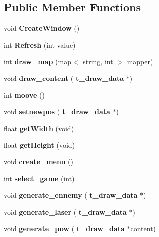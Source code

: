 \subsection*{Public Member Functions}
\begin{DoxyCompactItemize}
\item 
\mbox{\label{classlib___n_c_u_r_s_e_s_a4e2b18378fc2f8e137450e1ce204ab03}} 
void {\bfseries Create\+Window} ()
\item 
\mbox{\label{classlib___n_c_u_r_s_e_s_a74e4f4b1e3b127fa9a0acc40ab01796e}} 
int {\bfseries Refresh} (int value)
\item 
\mbox{\label{classlib___n_c_u_r_s_e_s_a3ebfea69ca0b0cc90be5bef4f3bb0827}} 
int {\bfseries draw\+\_\+map} (map$<$ string, int $>$ mapper)
\item 
\mbox{\label{classlib___n_c_u_r_s_e_s_aa1be8bdce0b43949cddfa0596c3e8651}} 
void {\bfseries draw\+\_\+content} (\textbf{ t\+\_\+draw\+\_\+data} $\ast$)
\item 
\mbox{\label{classlib___n_c_u_r_s_e_s_ae4b417576565df165b47f08f87313e56}} 
int {\bfseries moove} ()
\item 
\mbox{\label{classlib___n_c_u_r_s_e_s_a3443375019352383bb3162a26c990bc3}} 
void {\bfseries setnewpos} (\textbf{ t\+\_\+draw\+\_\+data} $\ast$)
\item 
\mbox{\label{classlib___n_c_u_r_s_e_s_a340d17967c5d4a9a53e60f9903d19537}} 
float {\bfseries get\+Width} (void)
\item 
\mbox{\label{classlib___n_c_u_r_s_e_s_a35d9e822c9d082583a1919afcc047ca1}} 
float {\bfseries get\+Height} (void)
\item 
\mbox{\label{classlib___n_c_u_r_s_e_s_a7e352deb80bbf27cd05355f407416361}} 
void {\bfseries create\+\_\+menu} ()
\item 
\mbox{\label{classlib___n_c_u_r_s_e_s_a2020dbc7ac13eaaf09f63025b783094e}} 
int {\bfseries select\+\_\+game} (int)
\item 
\mbox{\label{classlib___n_c_u_r_s_e_s_a357d104d6d2aa8e3e42479eb5dc19a79}} 
void {\bfseries generate\+\_\+ennemy} (\textbf{ t\+\_\+draw\+\_\+data} $\ast$)
\item 
\mbox{\label{classlib___n_c_u_r_s_e_s_a6c5b3ee239481d6d9cb022e152b77052}} 
void {\bfseries generate\+\_\+laser} (\textbf{ t\+\_\+draw\+\_\+data} $\ast$)
\item 
\mbox{\label{classlib___n_c_u_r_s_e_s_ab1e17e1c0e0c288261f0558cc7d1458f}} 
void {\bfseries generate\+\_\+pow} (\textbf{ t\+\_\+draw\+\_\+data} $\ast$content)
\end{DoxyCompactItemize}
